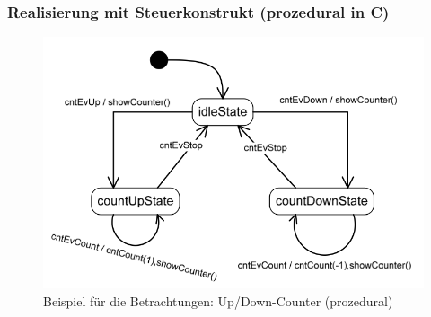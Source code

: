 \subsubsection{Realisierung mit Steuerkonstrukt (prozedural in C)}
\begin{figure}[h]
  \centering
  {\includegraphics[scale = 0.4]{images/FSM/Up_down_counter}  
  \caption{Beispiel für die Betrachtungen: Up/Down-Counter (prozedural)}
  \label{fig:up_down_counter}}
\end{figure}
